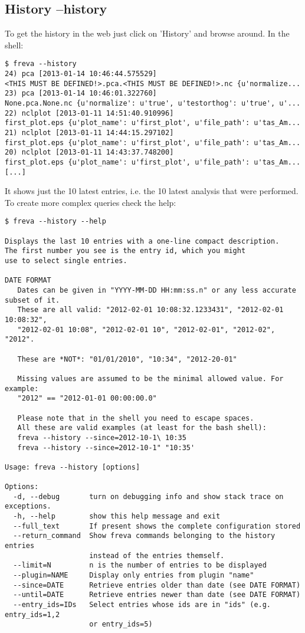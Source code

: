\documentclass[a4paper,11pt]{ltxdoc}
\begin{document}
\subsection{History --history}
To get the history in the web just click on 'History' and browse around. In the shell:
\begin{lstlisting}
$ freva --history
24) pca [2013-01-14 10:46:44.575529] 
<THIS MUST BE DEFINED!>.pca.<THIS MUST BE DEFINED!>.nc {u'normalize...
23) pca [2013-01-14 10:46:01.322760] 
None.pca.None.nc {u'normalize': u'true', u'testorthog': u'true', u'...
22) nclplot [2013-01-11 14:51:40.910996] 
first_plot.eps {u'plot_name': u'first_plot', u'file_path': u'tas_Am...
21) nclplot [2013-01-11 14:44:15.297102] 
first_plot.eps {u'plot_name': u'first_plot', u'file_path': u'tas_Am...
20) nclplot [2013-01-11 14:43:37.748200] 
first_plot.eps {u'plot_name': u'first_plot', u'file_path': u'tas_Am...
[...]
\end{lstlisting}
It shows just the 10 latest entries, i.e. the 10 latest analysis that were performed. To create more complex queries check the help:
\begin{lstlisting}
$ freva --history --help

Displays the last 10 entries with a one-line compact description.
The first number you see is the entry id, which you might 
use to select single entries.

DATE FORMAT
   Dates can be given in "YYYY-MM-DD HH:mm:ss.n" or any less accurate subset of it.
   These are all valid: "2012-02-01 10:08:32.1233431", "2012-02-01 10:08:32",
   "2012-02-01 10:08", "2012-02-01 10", "2012-02-01", "2012-02", "2012".

   These are *NOT*: "01/01/2010", "10:34", "2012-20-01" 

   Missing values are assumed to be the minimal allowed value. For example:
   "2012" == "2012-01-01 00:00:00.0" 

   Please note that in the shell you need to escape spaces. 
   All these are valid examples (at least for the bash shell):    
   freva --history --since=2012-10-1\ 10:35
   freva --history --since=2012-10-1" "10:35'

Usage: freva --history [options]

Options:
  -d, --debug       turn on debugging info and show stack trace on exceptions.
  -h, --help        show this help message and exit
  --full_text       If present shows the complete configuration stored
  --return_command  Show freva commands belonging to the history entries
                    instead of the entries themself.
  --limit=N         n is the number of entries to be displayed
  --plugin=NAME     Display only entries from plugin "name" 
  --since=DATE      Retrieve entries older than date (see DATE FORMAT)
  --until=DATE      Retrieve entries newer than date (see DATE FORMAT)
  --entry_ids=IDs   Select entries whose ids are in "ids" (e.g. entry_ids=1,2
                    or entry_ids=5)
\end{lstlisting}
\end{document}
